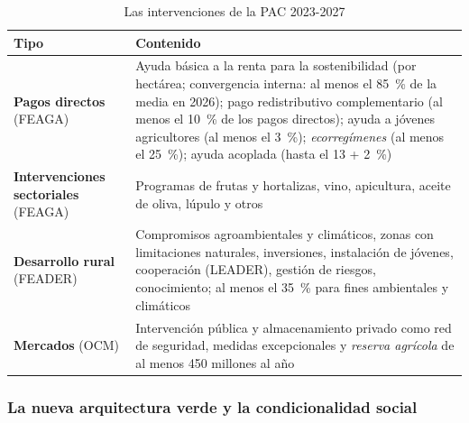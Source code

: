 \documentclass[11pt]{article}
\begin{document}
\begin{table}[H]
\centering
\caption{Las intervenciones de la PAC 2023-2027}\label{tab:intervenciones}
\small
\begin{tabular}{>{\raggedright\arraybackslash}m{3.4cm}>{\raggedright\arraybackslash}m{11.0cm}}
\toprule
\rowcolor{tceeazulpalido} \textbf{Tipo} & \textbf{Contenido}\\
\midrule
\textbf{Pagos directos} (FEAGA) & Ayuda básica a la renta para la sostenibilidad (por hectárea; convergencia interna: al menos el 85~\% de la media en 2026); pago redistributivo complementario (al menos el 10~\% de los pagos directos); ayuda a jóvenes agricultores (al menos el 3~\%); \emph{ecorregímenes} (al menos el 25~\%); ayuda acoplada (hasta el 13 + 2~\%)\\
\addlinespace[0.2em]
\textbf{Intervenciones sectoriales} (FEAGA) & Programas de frutas y hortalizas, vino, apicultura, aceite de oliva, lúpulo y otros\\
\addlinespace[0.2em]
\textbf{Desarrollo rural} (FEADER) & Compromisos agroambientales y climáticos, zonas con limitaciones naturales, inversiones, instalación de jóvenes, cooperación (LEADER), gestión de riesgos, conocimiento; al menos el 35~\% para fines ambientales y climáticos\\
\addlinespace[0.2em]
\textbf{Mercados} (OCM) & Intervención pública y almacenamiento privado como red de seguridad, medidas excepcionales y \emph{reserva agrícola} de al menos 450 millones al año\\
\bottomrule
\end{tabular}
\end{table}

\subsubsection{La nueva arquitectura verde\cortetitulo{} y la condicionalidad social}\label{sec:arquitectura-verde}
\end{document}
